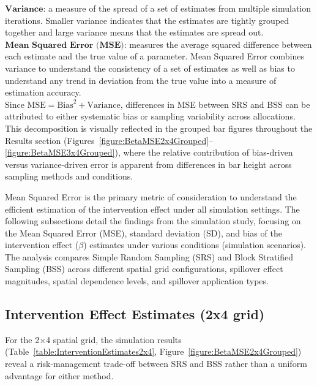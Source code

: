 \documentclass{article}[11pt]
\begin{document}
\noindent $\textbf{Variance}$: a measure of the spread of a set of estimates from multiple simulation iterations. Smaller variance indicates that the estimates are tightly grouped together and large variance means that the estimates are spread out.\\

\noindent $\textbf{Mean Squared Error (MSE)}$: measures the average squared difference between each estimate and the true value of a parameter. Mean Squared Error combines variance to understand the consistency of a set of estimates as well as bias to understand any trend in deviation from the true value into a measure of estimation accuracy.\\

Since $\text{MSE} = \text{Bias}^2 + \text{Variance}$, differences in MSE between SRS and BSS can be attributed to either systematic bias or sampling variability across allocations. This decomposition is visually reflected in the grouped bar figures throughout the Results section (Figures~\ref{figure:BetaMSE2x4Grouped}--\ref{figure:BetaMSE3x4Grouped}), where the relative contribution of bias-driven versus variance-driven error is apparent from differences in bar height across sampling methods and conditions.

Mean Squared Error is the primary metric of consideration to understand the efficient estimation of the intervention effect under all simulation settings. The following subsections detail the findings from the simulation study, focusing on the Mean Squared Error (MSE), standard deviation (SD), and bias of the intervention effect ($\beta$) estimates under various conditions (simulation scenarios). The analysis compares Simple Random Sampling (SRS) and Block Stratified Sampling (BSS) across different spatial grid configurations, spillover effect magnitudes, spatial dependence levels, and spillover application types.

\subsection{Intervention Effect Estimates (2x4 grid)}

For the 2$\times$4 spatial grid, the simulation results (Table~\ref{table:InterventionEstimates2x4}, Figure~\ref{figure:BetaMSE2x4Grouped}) reveal a risk-management trade-off between SRS and BSS rather than a uniform advantage for either method.
\end{document}
